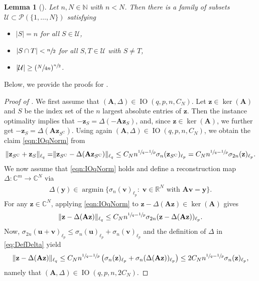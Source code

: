 \documentclass[11pt,reqno, a4paper]{article}
\numberwithin{equation}{section}
\newtheorem{lemma}[theorem]{Lemma}
\newcommand{\N}{\mathbb{N}}
\newcommand{\C}{\mathbb{C}}
\DeclareMathOperator*{\argmin}{argmin}
\begin{document}
\begin{lemma}[{\cite[Lem.\ 2.3]{FouPajRauUll10}}]\label{thm:SubsetCombinations}
Let $n,N\in\N$ with $n<N$. Then there is a family of subsets $\mathcal{U}\subset\mathcal{P}(\{1,\ldots,N\})$ satisfying 
\begin{itemize}
    \item $\lvert S\rvert=n$ for all $S\in\mathcal{U}$,
    \item $\lvert S\cap T\rvert<\sfrac{n}{2}$ for all $S,T\in\mathcal{U}$ with $S\neq T$,
    \item $\lvert\mathcal{U}\rvert\geq(\sfrac{N}{4n})^{\sfrac{n}{2}}$.
\end{itemize}
\end{lemma}
Below, we provide the proofs for .
\begin{proof}[Proof of ]
We first assume that $(\mathbf{A},\Delta)\in\operatorname{IO}(q,p,n,C_N)$. Let $\mathbf{z}\in\ker(\mathbf{A})$ and $S$ be the index set of the $n$ largest absolute entries of $\mathbf{z}$. Then the instance optimality implies that $-\mathbf{z}_S=\Delta(-\mathbf{A}\mathbf{z}_S)$, and, since $\mathbf{z}\in\ker(\mathbf{A})$, we further get $-\mathbf{z}_S=\Delta(\mathbf{A}\mathbf{z}_{S^\mathrm{C}})$. Using again $(\mathbf{A},\Delta)\in\operatorname{IO}(q,p,n,C_N)$, we obtain the claim \eqref{eqn:IOqNorm} from
\begin{align}
\lVert\mathbf{z}_{S^\mathrm{C}}+\mathbf{z}_S\rVert_{\ell_q}=\rVert\mathbf{z}_{S^\mathrm{C}}-\Delta(\mathbf{A}\mathbf{z}_{S^\mathrm{C}})\rVert_{\ell_q} \leq C_Nn^{\sfrac{1}{q}-\sfrac{1}{p}}\sigma_n(\mathbf{z}_{S^\mathrm{C}})_{\ell_p}= C_Nn^{\sfrac{1}{q}-\sfrac{1}{p}}\sigma_{2n}(\mathbf{z})_{\ell_p}.
\end{align}
We now assume that \eqref{eqn:IOqNorm} holds and define a reconstruction map $\Delta\colon \C^m \to\C^N$ via
\begin{align}\label{eq:DefDelta}
\Delta(\mathbf{y}) \in \argmin \bigl\{\sigma_n(\mathbf{v})_{\ell_p}\colon \; \mathbf{v}\in\mathbb{R}^N \text{ with } \mathbf{A}\mathbf{v}=\mathbf{y}\bigr\}.
\end{align}
For any $\mathbf{z}\in\mathbb{C}^N$, applying \eqref{eqn:IOqNorm} to $\mathbf{z}-\Delta(\mathbf{A}\mathbf{z})\in\ker(\mathbf{A})$ gives
\begin{align}
\lVert\mathbf{z}-\Delta(\mathbf{A}\mathbf{z})\rVert_{\ell_q} \leq C_Nn^{\sfrac{1}{q}-\sfrac{1}{p}}\sigma_{2n}(\mathbf{z}-\Delta(\mathbf{A}\mathbf{z}))_{\ell_p}.
\end{align}
Now, $\sigma_{2n}(\mathbf{u}+\mathbf{v})_{\ell_p}\leq\sigma_n(\mathbf{u})_{\ell_p}+\sigma_n(\mathbf{v})_{\ell_p}$ and the definition of $\Delta$ in \eqref{eq:DefDelta} yield
\begin{align}
\lVert\mathbf{z}-\Delta(\mathbf{A}\mathbf{z})\rVert_{\ell_q}\leq C_Nn^{\sfrac{1}{q}-\sfrac{1}{p}}\left(\sigma_{n}(\mathbf{z})_{\ell_p}+\sigma_n(\Delta(\mathbf{A}\mathbf{z}))_{\ell_p}\right)\leq 2C_Nn^{\sfrac{1}{q}-\sfrac{1}{p}}\sigma_{n}(\mathbf{z})_{\ell_p},
\end{align}
namely that $(\mathbf{A},\Delta)\in\operatorname{IO}(q,p,n,2C_N)$.
\end{proof}
\end{document}

